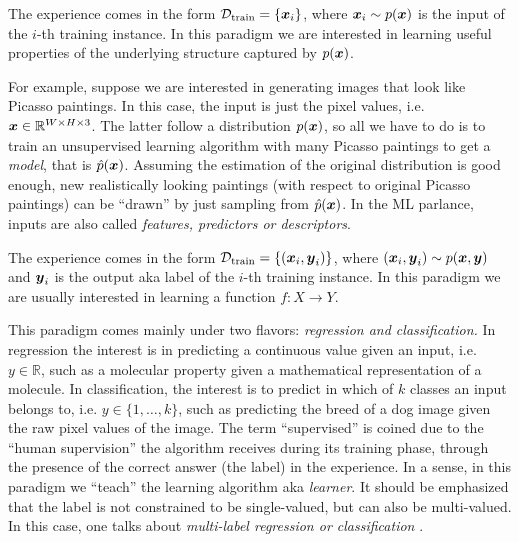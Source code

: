 \begin{definition}[name=Unsupervised learning]
	The experience comes in the form $\mathcal{D}_\text{train} = \{\boldsymbol{x}_i\}$, where $\boldsymbol{x}_i \sim
	p(\boldsymbol{x})$ is the input of the $i$-th training
	instance. In this paradigm we are interested in
	learning useful properties of the underlying structure captured by
	$p(\boldsymbol{x})$.
\end{definition}

For example, suppose we are interested in generating images that look like
Picasso paintings. In this case, the input is just the pixel values, i.e.  $\boldsymbol{x}
\in \mathbb{R}^{W \times H \times 3}$. The latter follow a distribution
$p(\boldsymbol{x})$, so all we have to do is to train an unsupervised learning algorithm
with many Picasso paintings to get a \emph{model}, that is $\hat{p}(\boldsymbol{x})$.
Assuming the estimation of the original distribution is good enough, new
realistically looking paintings (with respect to original Picasso paintings) can
be ``drawn'' by just sampling from $\hat{p}(\boldsymbol{x})$. In the ML parlance, inputs
are also called \emph{features, predictors or
descriptors}.

\begin{definition}[name=Supervised learning]
	The experience comes in the form $\mathcal{D}_\text{train} = \{(\boldsymbol{x}_i, \boldsymbol{y}_i)\}$, where
	$(\boldsymbol{x}_i, \boldsymbol{y}_i) \sim p(\boldsymbol{x}, \boldsymbol{y})$ and $\boldsymbol{y}_i$ is the
	output aka label of the $i$-th training instance.
	In this paradigm we are usually interested in learning a function $f \colon
	X \to Y$.
\end{definition}

This paradigm comes mainly under two flavors: \emph{regression
and classification.} In regression the interest is in
predicting a continuous value given an input, i.e.  $y \in \mathbb{R}$, such as
a molecular property given a mathematical representation of a molecule. In
classification, the interest is to predict in which of $k$ classes an input
belongs to, i.e. $y \in \{1, \ldots, k\}$, such as predicting the breed of a dog
image given the raw pixel values of the image. The term ``supervised'' is coined
due to the ``human supervision'' the algorithm receives during its training
phase, through the presence of the correct answer (the label) in the experience.
In a sense, in this paradigm we ``teach'' the learning algorithm aka
\emph{learner}. It should be emphasized that the label is not constrained to be
single-valued, but can also be multi-valued. In this case, one talks about
\emph{multi-label regression or
classification} \parencite{Read_2009}.

